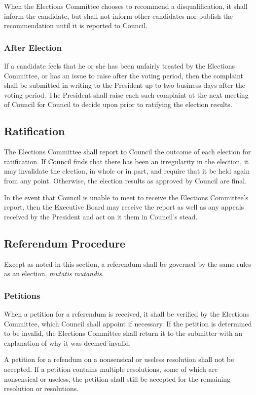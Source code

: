 When the Elections Committee chooses to recommend a disqualification, it shall
inform the candidate, but shall not inform other candidates nor publish the
recommendation until it is reported to Council.

\subsubsection{After Election}
If a candidate feels that he or she has been unfairly treated by the Elections
Committee, or has an issue to raise after the voting period, then the complaint
shall be submitted in writing to the President up to two business days after the
voting period. The President shall raise each such complaint at the next meeting
of Council for Council to decide upon prior to ratifying the election results.

\subsection{Ratification}
The Elections Committee shall report to Council the outcome of each election for
ratification. If Council finds that there has been an irregularity in the
election, it may invalidate the election, in whole or in part, and require that
it be held again from any point. Otherwise, the election results as approved by
Council are final.

In the event that Council is unable to meet to receive the Elections Committee's
report, then the Executive Board may receive the report as well as any appeals
received by the President and act on it them in Council's stead.

\subsection{Referendum Procedure}
Except as noted in this section, a referendum shall be governed by the same
rules as an election, \emph{mutatis mutandis}.

\subsubsection{Petitions}
When a petition for a referendum is received, it shall be verified by the
Elections Committee, which Council shall appoint if necessary. If the petition
is determined to be invalid, the Elections Committee shall return it to the
submitter with an explanation of why it was deemed invalid.

A petition for a refendum on a nonsensical or useless resolution shall not be
accepted. If a petition contains multiple resolutions, some of which are
nonsensical or useless, the petition shall still be accepted for the remaining
resolution or resolutions.


